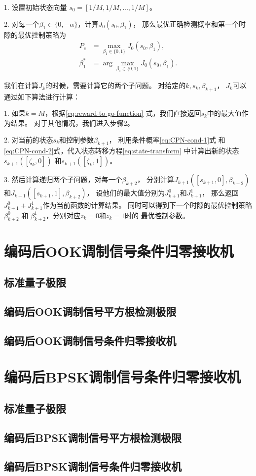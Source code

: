 1. 设置初始状态向量 $s_0=[1/M,1/M, ..., 1/M]$。

2. 对每一个$\beta_{1} \in \{0, -\alpha \}$，计算$J_0(s_0, \beta_1)$，
   那么最优正确检测概率和第一个时隙的最优控制策略为
   \begin{equation}
   \begin{split}
   P_c &= \max_{\beta_1 \in \{0, 1 \} } J_0(s_0, \beta_1), \\
   \beta_1^* &= \arg \max_{\beta_1 \in \{0, 1 \} } J_0(s_0, \beta_1).
   \end{split}
   \end{equation}

我们在计算$J_k$的时候，需要计算它的两个子问题。
对给定的$k, s_k, \beta_{k+1}$，
$J_k$可以通过如下算法进行计算：

1. 如果$k=M$，根据\ref{eq:reward-to-go-function}
   式，我们直接返回$s_k$中的最大值作为结果。
   对于其他情况，我们进入步骤2。
   
2. 对当前的状态$s_k$和控制参数$\beta_{k+1}$，
   利用条件概率\ref{eq:CPN-cond-1}式
   和\ref{eq:CPN-cond-2}式，代入状态转移方程\ref{eq:state-transform}
   中计算出新的状态$s_{k+1}([\zeta_k, 0])$
   和$s_{k+1}([\zeta_k, 1])$。
   
3. 然后计算递归两个子问题，对每一个$\beta_{k+2}$，
   分别计算$J_{k+1}([s_{k+1},0], \beta_{k+2})$
   和$J_{k+1}([s_{k+1},1], \beta_{k+2})$，
   设他们的最大值分别为$J_{k+1}^0$和$J_{k+1}^1$，
   那么返回$J_{k+1}^0 + J_{k+1}^1$作为当前函数的计算结果。
   同时可以得到下一个时隙的最优控制策略$\beta_{k+2}^0$
   和 $\beta_{k+2}^1$，分别对应$z_k=0$和$z_k=1$时的
   最优控制参数。
   
   


\section{编码后OOK调制信号条件归零接收机}
\subsection{标准量子极限}

\subsection{编码后OOK调制信号平方根检测极限}

\subsection{编码后OOK调制信号条件归零接收机}



\section{编码后BPSK调制信号条件归零接收机}
\subsection{标准量子极限}

\subsection{编码后BPSK调制信号平方根检测极限}

\subsection{编码后BPSK调制信号条件归零接收机}



